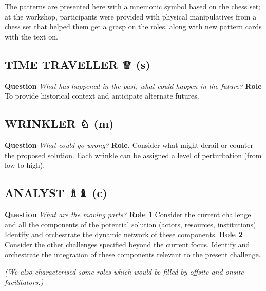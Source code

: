 \documentclass[acmlarge,timestamp]{acmart}
\newcommand{\sensory}{(s)}
\newcommand{\cognitive}{(c)}
\newcommand{\motor}{(m)}
\begin{document}
The patterns are presented here with a mnemonic symbol based on the
chess set; at the workshop, participants were provided with physical
manipulatives from a chess set that helped them get a grasp on the
roles, along with new pattern cards with the text on.

\subsection*{TIME TRAVELLER {\chess ♕} {\hfill \sensory}}

\textbf{Question} \emph{What has happened in the past, what could
happen in the future?}\newline
\textbf{Role} To provide historical context and
anticipate alternate futures.

\subsection*{WRINKLER {\chess ♘} {\hfill \motor}}

\textbf{Question} \emph{What could go wrong? }\newline
\textbf{Role.} Consider what might derail or counter
the proposed solution.  Each wrinkle can be assigned a level of
perturbation (from low to high).

\subsection*{ANALYST {\chess ♗♝} {\hfill \cognitive}}

\textbf{Question} \emph{What are the moving parts?}\newline
\textbf{Role 1} Consider the current challenge and all the components
of the potential solution (actors, resources, institutions). Identify
and orchestrate the dynamic network of these components.\newline
\textbf{Role 2} Consider the other challenges specified beyond the
current focus.  Identify and orchestrate the integration of these
components relevant to the present challenge.

\smallskip

\noindent \emph{(We also characterised some roles which would be
filled by offsite and onsite facilitators.)}
\end{document}
